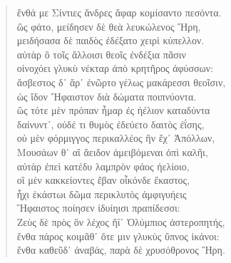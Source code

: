\begin{Spacing}{1.5}
\begin{verse}
{\large\g ἔνθά με Σίντιες ἄνδρες ἄφαρ κομίσαντο πεσόντα.  } \\
{\large\g ὣς φάτο, μείδησεν δὲ θεὰ λευκώλενος Ἥρη,  } \\
{\large\g μειδήσασα δὲ παιδὸς ἐδέξατο χειρὶ κύπελλον.  } \\
{\large\g αὐτὰρ ὃ τοῖς ἄλλοισι θεοῖς ἐνδέξια πᾶσιν  } \\
{\large\g οἰνοχόει γλυκὺ νέκταρ ἀπὸ κρητῆρος ἀφύσσων:  } \\
{\large\g ἄσβεστος δ᾽ ἄρ᾽ ἐνῶρτο γέλως μακάρεσσι θεοῖσιν,  } \\
{\large\g ὡς ἴδον Ἥφαιστον διὰ δώματα ποιπνύοντα.  } \\
{\large\g ὣς τότε μὲν πρόπαν ἦμαρ ἐς ἠέλιον καταδύντα  } \\
{\large\g δαίνυντ᾽, οὐδέ τι θυμὸς ἐδεύετο δαιτὸς ἐΐσης,  } \\
{\large\g οὐ μὲν φόρμιγγος περικαλλέος ἣν ἔχ᾽ Ἀπόλλων,  } \\
{\large\g Μουσάων θ᾽ αἳ ἄειδον ἀμειβόμεναι ὀπὶ καλῆι,  } \\
{\large\g αὐτὰρ ἐπεὶ κατέδυ λαμπρὸν φάος ἠελίοιο,  } \\
{\large\g οἳ μὲν κακκείοντες ἔβαν οἶκόνδε ἕκαστος,  } \\
{\large\g ἧχι ἑκάστωι δῶμα περικλυτὸς ἀμφιγυήεις  } \\
{\large\g Ἥφαιστος ποίησεν ἰδυίηισι πραπίδεσσι:  } \\
{\large\g Ζεὺς δὲ πρὸς ὃν λέχος ἤϊ᾽ Ὀλύμπιος ἀστεροπητής,  } \\
{\large\g ἔνθα πάρος κοιμᾶθ᾽ ὅτε μιν γλυκὺς ὕπνος ἱκάνοι:  } \\
{\large\g ἔνθα καθεῦδ᾽ ἀναβάς, παρὰ δὲ χρυσόθρονος Ἥρη.  } \\
\end{verse}  %
\end{Spacing}


